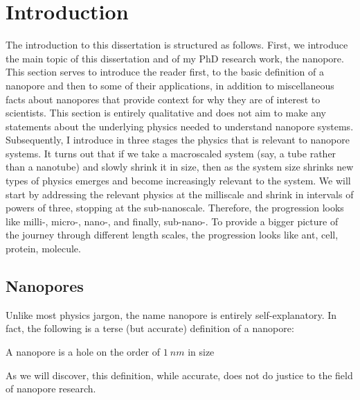 \graphicspath{{../images/ch1/}}	%


\chapter{Introduction}

	The introduction to this dissertation is structured as follows. First, we introduce the main topic of this dissertation and of my PhD research work, the nanopore. This section serves to introduce the reader first, to the basic definition of a nanopore and then to some of their applications, in addition to miscellaneous facts about nanopores that provide context for why they are of interest to scientists. This section is entirely qualitative and does not aim to make any statements about the underlying physics needed to understand nanopore systems. Subsequently, I introduce in three stages the physics that is relevant to nanopore systems. It turns out that if we take a macroscaled system (say, a tube rather than a nanotube) and slowly shrink it in size, then as the system size shrinks new types of physics emerges and become increasingly relevant to the system. We will start by addressing the relevant physics at the milliscale and shrink in intervals of powers of three, stopping at the sub-nanoscale. Therefore, the progression looks like milli-, micro-, nano-, and finally, sub-nano-. To provide a bigger picture of the journey through different length scales, the progression looks like ant, cell, protein, molecule.

	\section{Nanopores}

		Unlike most physics jargon, the name nanopore is entirely self-explanatory. In fact, the following is a terse (but accurate) definition of a nanopore:


		\begin{definition} \label{def:nanopore}
			A nanopore is a hole on the order of $\SI{1}{nm}$ in size
		\end{definition}


		As we will discover, this definition, while accurate, does not do justice to the field of nanopore research. 

